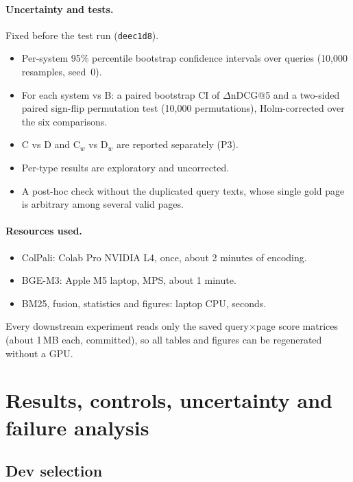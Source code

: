 \documentclass[11pt,a4paper]{article}
\newcommand{\lbl}[2]{\textsf{\scriptsize\textcolor{#1}{[#2]}}}
\newcommand{\Mea}{\lbl{tagM}{Measured}}
\newcommand{\file}[1]{\texttt{\small\hyphenchar\font=`\/ #1}}
\begin{document}
\paragraph{Uncertainty and tests.} Fixed before the test run (\texttt{deec1d8}).
\begin{itemize}
  \item Per-system 95\% percentile bootstrap confidence intervals over queries (10,000 resamples, seed~0).
  \item For each system vs B: a paired bootstrap CI of $\Delta$nDCG@5 and a two-sided paired sign-flip permutation test (10,000 permutations), Holm-corrected over the six comparisons.
  \item C vs D and C$_w$ vs D$_w$ are reported separately (P3).
  \item Per-type results are exploratory and uncorrected.
  \item A post-hoc check without the \nDup{} duplicated query texts, whose single gold page is arbitrary among several valid pages.
\end{itemize}

\paragraph{Resources used.}
\begin{itemize}
  \item ColPali: Colab Pro NVIDIA L4, once, about 2 minutes of encoding.
  \item BGE-M3: Apple M5 laptop, MPS, about 1 minute.
  \item BM25, fusion, statistics and figures: laptop CPU, seconds.
\end{itemize}
Every downstream experiment reads only the saved query$\times$page score matrices (about 1\,MB each, committed), so all tables and figures can be regenerated without a GPU.

\section{Results, controls, uncertainty and failure analysis}
\label{sec:results}

\subsection{Dev selection}
\begin{table}[!htbp]\centering\small

\caption{\Mea{} Dev-split selection (\file{results/fusion\_docvqa/dev\_selection*.json}).}\label{tab:dev}
\end{table}
\end{document}
